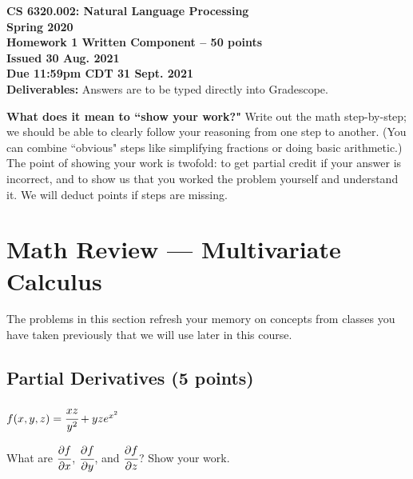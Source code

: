 \documentclass[12pt,a4paper]{article}
\begin{document}
\pagestyle{empty}

\textbf{CS 6320.002: Natural Language Processing} \\
\textbf{Spring 2020} \\

\textbf{Homework 1 Written Component -- 50 points} \\
\textbf{Issued 30 Aug. 2021} \\
\textbf{Due 11:59pm CDT 31 Sept. 2021} \\

\textbf{Deliverables:} Answers are to be typed directly into Gradescope.

\vspace{\baselineskip}

\textbf{What does it mean to ``show your work?"} Write out the math step-by-step; we should be able to clearly follow your reasoning from one step to another. (You can combine ``obvious" steps like simplifying fractions or doing basic arithmetic.) The point of showing your work is twofold: to get partial credit if your answer is incorrect, and to show us that you worked the problem yourself and understand it. We will deduct points if steps are missing.

\section{Math Review --- Multivariate Calculus}

The problems in this section refresh your memory on concepts from classes you have taken previously that we will use later in this course.

\subsection{Partial Derivatives (5 points)}

\begin{center}
$f(x, y, z) = \cfrac{xz}{y^2} + yz e^{x^2}$
\end{center}

What are $\cfrac{\partial f}{\partial x}$, $\cfrac{\partial f}{\partial y}$, and $\cfrac{\partial f}{\partial z}$? Show your work.


{
}
\end{document}
